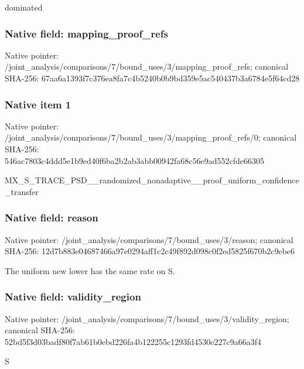 \documentclass[10pt,a4paper]{article}
\begin{document}
\begingroup\raggedright\sloppy dominated\par\endgroup

\subsubsection{Native field: mapping\_\allowbreak{}proof\_\allowbreak{}refs}
Native pointer: /joint\_\allowbreak{}analysis/comparisons/7/bound\_\allowbreak{}uses/3/mapping\_\allowbreak{}proof\_\allowbreak{}refs; canonical SHA-256: 67aa6a1393f7c376ea8fa7c4b5240b0b9bd359e5ac540437b3a6784e5f64cd28

\subsubsection{Native item 1}
Native pointer: /joint\_\allowbreak{}analysis/comparisons/7/bound\_\allowbreak{}uses/3/mapping\_\allowbreak{}proof\_\allowbreak{}refs/0; canonical SHA-256: 546ac7803c4ddd5e1b9ed40f6ba2b2ab3abb00942fa68c56e9ad552cfde66305

\begingroup\raggedright\sloppy MX\_\allowbreak{}S\_\allowbreak{}TRACE\_\allowbreak{}PSD\_\allowbreak{}\_\allowbreak{}randomized\_\allowbreak{}nonadaptive\_\allowbreak{}\_\allowbreak{}proof\_\allowbreak{}uniform\_\allowbreak{}confidence\_\allowbreak{}transfer\par\endgroup

\subsubsection{Native field: reason}
Native pointer: /joint\_\allowbreak{}analysis/comparisons/7/bound\_\allowbreak{}uses/3/reason; canonical SHA-256: 12d7b883e04687466a97e0294aff1c2c49f892d098c0f2ed5825f670b2c9ebe6

\begingroup\raggedright\sloppy The uniform new lower has the same rate on S.\par\endgroup

\subsubsection{Native field: validity\_\allowbreak{}region}
Native pointer: /joint\_\allowbreak{}analysis/comparisons/7/bound\_\allowbreak{}uses/3/validity\_\allowbreak{}region; canonical SHA-256: 52bd5f3d03badf80f7ab61b0ebd226fa4b122255c1293fd4530e227c9a66a3f4

\begingroup\raggedright\sloppy S\par\endgroup
\end{document}
